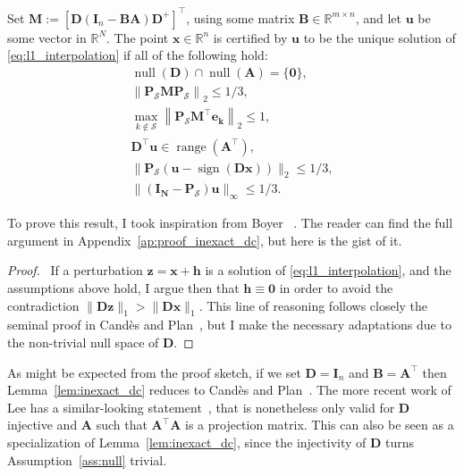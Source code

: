 \begin{lemma}\label{lem:inexact_dc} Set $\mathbf{M} := \left [ \mathbf{D} (\mathbf{I}_n - \mathbf{B} \mathbf{A}) \mathbf{D}^{+} \right ] ^{\top}$, using some matrix $\mathbf{B} \in \mathbb{R}^{m \times n}$, and let $\mathbf{u}$ be some vector in $\mathbb{R}^{N}$. The point $\mathbf{x} \in \mathbb{R}^{n}$ is certified by $\mathbf{u}$ to be the unique solution of \eqref{eq:l1_interpolation} if all of the following hold:
\begin{align}
\tag{A1} \label{ass:null} \operatorname{null} \left ( \mathbf{D} \right ) \cap \operatorname{null} \left ( \mathbf{A} \right ) = \{ \mathbf{0} \}, \\
\tag{A2} \label{ass:approxPS} \left \| \mathbf{P_\mathcal{S} M P_\mathcal{S}} \right \|_{2} \leq 1 / 3, \\
\tag{A3} \label{ass:boundOffSupport} \underset{k \notin \mathcal{S}}{\max} \left \| \mathbf{P_\mathcal{S} M^{\top} e_k} \right \|_2 \leq 1, \\
\tag{A4} \label{ass:range} \mathbf{D^{\top} u} \in \operatorname{range} \left ( \mathbf{A^{\top}} \right ), \\
\tag{A5} \label{ass:approxSign} \| \mathbf{P}_\mathcal{S} ( \mathbf{u} - \operatorname{sign} \left ( \mathbf{Dx} \right ) ) \|_2 \leq 1 / 3, \\
\tag{A6} \label{ass:approxOffSupport} \| \mathbf{(I_N - P_\mathcal{S}) u} \|_{\infty} \leq 1 / 3.
\end{align}
\end{lemma}

To prove this result, I took inspiration from Boyer \etal~\cite[Appendix A]{boyer2019}. The reader can find the full argument in Appendix~\ref{ap:proof_inexact_dc}, but here is the gist of it.

\begin{proof}
    \pfsketch\ If a perturbation $\mathbf{z} = \mathbf{x + h}$ is a solution of \ref{eq:l1_interpolation}, and the assumptions above hold, I argue then that $\mathbf{h} \equiv \mathbf{0}$ in order to avoid the contradiction $\| \mathbf{D z} \|_1 > \| \mathbf{D x} \|_1$. This line of reasoning follows closely the seminal proof in Cand\`es and Plan~\cite[Lemma 3.2]{candes2011b}, but I make the necessary adaptations due to the non-trivial null space of $\mathbf{D}$.
\end{proof}

As might be expected from the proof sketch, if we set $\mathbf{D} = \mathbf{I}_n$ and $\mathbf{B} = \mathbf{A}^{\top}$ then Lemma~\ref{lem:inexact_dc} reduces to Cand\`es and Plan~\cite[Lemma 3.2]{candes2011b}. The more recent work of Lee \etal has a similar-looking statement~\cite[Lemma 21]{lee2018}, that is nonetheless only valid for $\mathbf{D}$ injective and $\mathbf{A}$ such that $\mathbf{A^\top A}$ is a projection matrix. This can also be seen as a specialization of Lemma~\ref{lem:inexact_dc}, since the injectivity of $\mathbf{D}$ turns Assumption~\ref{ass:null} trivial.

